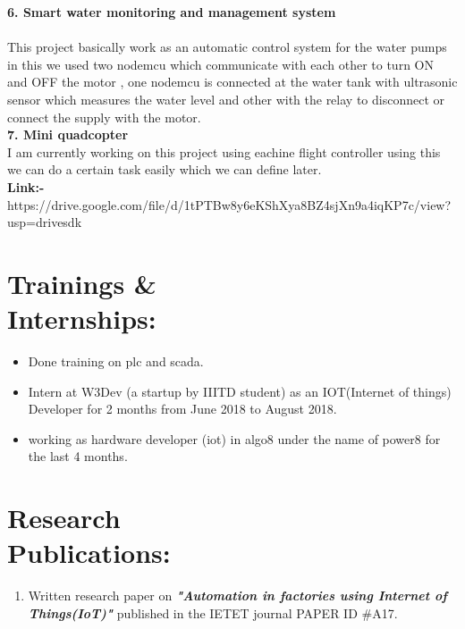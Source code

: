 \documentclass[10pt]{report}
\begin{document}
\noindent\textbf{\large 6. Smart water monitoring and management system\\[1pt]}
\\This project basically work as an automatic control system for the water pumps in this we used two nodemcu which communicate with each other to turn ON and OFF the motor , one nodemcu is connected at the water tank with ultrasonic sensor which measures the water level and other with the relay to disconnect or connect the supply with the motor.\\[2pt] 

\noindent\textbf{\large 7. Mini quadcopter}
\\I am currently working on this project using eachine flight controller using this we can do a certain task easily which we can define later.
\\\textbf{Link:-} https://drive.google.com/file/d/1tPTBw8y6eKShXya8BZ4sjXn9a4iqKP7c/view?usp=drivesdk




\section*{Trainings \&\\ Internships:} %
\begin{itemize}
\item Done training on plc and scada.
\item Intern at W3Dev (a startup by IIITD student) as an IOT(Internet of things) Developer for 2 months from June 2018 to August 2018.
\item working as hardware developer (iot) in algo8 under the name of power8 for the last 4 months.
\end{itemize}

\section*{Research \\Publications:} %
\begin{enumerate}
	\item Written research paper on \textbf{\textit{"Automation in factories using Internet of Things(IoT)"}} published in the IETET journal   PAPER ID \#A17.
\end{enumerate}
\end{document}
